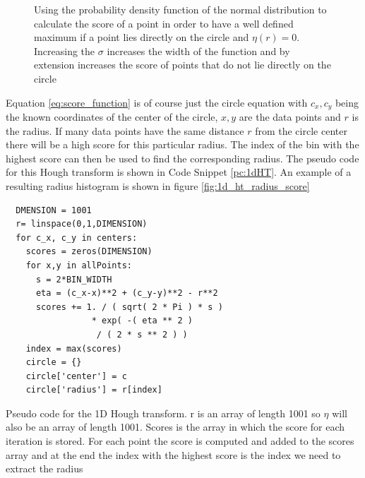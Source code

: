 \documentclass[11pt]{scrreprt}
\begin{document}
\begin{figure}[ht]
\centering
    \caption[Normal Distribution: Used as a weight function]{Using the probability density function of the normal distribution to 
    calculate the score of a point in order to have a well defined maximum if a point lies directly on the circle and $\eta(r) = 0$. 
    Increasing the $\sigma$ increases the width of the function and by extension increases the score of points that do not lie directly on the circle}
  \label{fig:gauss}
\end{figure}
Equation \ref{eq:score_function} is of course just the circle equation with $c_x, c_y$ being the known coordinates of the center of 
the circle, $x, y$ are the data points and $r$ is the radius. If many data points have the same distance $r$ from the circle 
center there will be a high score for this particular radius. The index of the bin with the highest score can then be used to find the 
corresponding radius. The pseudo code for this Hough transform is shown in Code Snippet \ref{pc:1dHT}. An example of a resulting radius
histogram is shown in figure \ref{fig:1d_ht_radius_score}

\begin{codesnippet}[htb]
  \begin{lstlisting}
  DMENSION = 1001
  r= linspace(0,1,DIMENSION)
  for c_x, c_y in centers:
    scores = zeros(DIMENSION)
    for x,y in allPoints:
      s = 2*BIN_WIDTH
      eta = (c_x-x)**2 + (c_y-y)**2 - r**2
      scores += 1. / ( sqrt( 2 * Pi ) * s ) 
                 * exp( -( eta ** 2 ) 
                  / ( 2 * s ** 2 ) )
    index = max(scores)
    circle = {}
    circle['center'] = c
    circle['radius'] = r[index]
\end{lstlisting}
\caption[Pseudo Code 1D HT]{Pseudo code for the 1D Hough transform. r is an array of length 1001 so $\eta$ will also be an 
array of length 1001. Scores is the array in which the score for each iteration is stored. For each point the score is computed and added 
to the scores array and at the end the index with the highest score is the index we need to extract the radius}\label{pc:1dHT}
\end{codesnippet}
\end{document}
